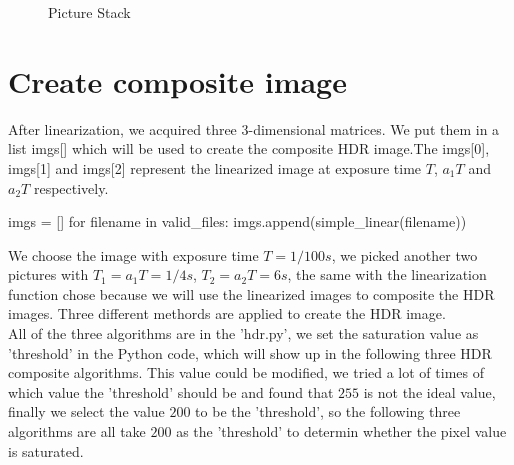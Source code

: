 \documentclass[10pt,twocolumn,letterpaper]{article}
\begin{document}
\begin{figure}[t]

\caption{Picture Stack}
\label{fig:picturestack}
\end{figure} 


\section{Create composite image}
\label{sec:create}
After linearization, we acquired three 3-dimensional matrices. We put them in a list imgs[] which will be used to create the composite HDR image.The imgs[0], imgs[1] and imgs[2] represent the linearized image at exposure time $T$, $a_{1}T$ and $a_{2}T$ respectively. \\

\begin{python}
imgs = []
for filename in valid_files:
	imgs.append(simple_linear(filename))
\end{python}

We choose the image with exposure time $T = 1/100s$, we picked another two pictures with $T_1 = a_{1}T = 1/4s$, $T_2 =a_{2}T = 6s$, the same with the linearization function chose because we will use the linearized images to composite the HDR images. Three different methords are applied to create the HDR image. \\



All of the three algorithms are in the 'hdr.py', we set the saturation value as 'threshold' in the Python code, which will show up in the following three HDR composite algorithms. This value could be modified, we tried a lot of times of which value the 'threshold' should be and found that $255$ is not the ideal value, finally we select the value $200$ to be the 'threshold', so the following three algorithms are all take $200$ as the 'threshold' to determin whether the pixel value is saturated. \\
\end{document}
